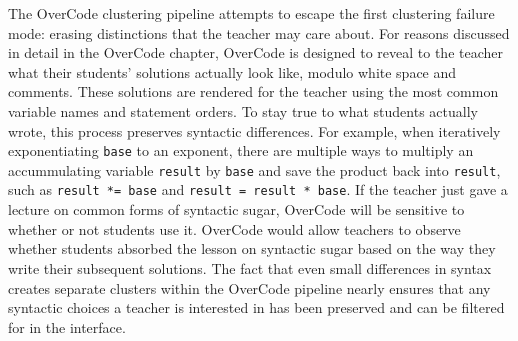 \documentclass[12pt,twoside]{mitthesis}
\providecommand{\DIFdelbegin}{} %
\providecommand{\DIFdelend}{} %
\begin{document}
The OverCode clustering pipeline attempts to escape the first clustering failure mode: erasing distinctions that the teacher may care about. For reasons discussed in detail in the OverCode chapter, OverCode is designed to reveal to the teacher what their students' solutions actually look like, modulo white space and comments. These solutions are rendered for the teacher using the most common variable names and statement orders. \DIFdelbegin %
\DIFdelend To stay true to what students actually wrote, this process preserves syntactic differences. For example, when iteratively exponentiating \texttt{base} to an exponent, there are multiple ways to multiply an accummulating variable \texttt{result} by \texttt{base} and save the product back into \texttt{result}, such as \texttt{result *= base} and \texttt{result = result * base}. If the teacher just gave a lecture on common forms of syntactic sugar, OverCode will be sensitive to whether or not students use it. OverCode would allow teachers to observe whether students absorbed the lesson on syntactic sugar based on the way they write their subsequent solutions. The fact that even small differences in syntax creates separate clusters within the OverCode pipeline nearly ensures that any syntactic choices a teacher is interested in has been preserved and can be filtered for in the interface.


\end{document}
